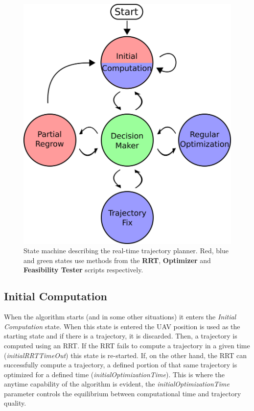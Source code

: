 \begin{figure}[H]
    \centering
    \includegraphics[width=0.6\linewidth]{Figures/06_software/stateColored.png}
    \caption{State machine describing the real-time trajectory planner. Red, blue and green states use methods from the \textbf{RRT}, \textbf{Optimizer} and \textbf{Feasibility Tester} scripts respectively.}
    \label{fig:stateMachine}
\end{figure}

\subsection{Initial Computation}

When the algorithm starts (and in some other situations) it enters the \textit{Initial Computation} state. When this state is entered the UAV position is used as the starting state and if there is a trajectory, it is discarded. Then, a trajectory is computed using an RRT. If the RRT fails to compute a trajectory in a given time (\textit{initialRRTTimeOut}) this state is re-started. If, on the other hand, the RRT can successfully compute a trajectory, a defined portion of that same trajectory is optimized for a defined time (\textit{initialOptimizationTime}). This is where the anytime capability of the algorithm is evident, the  \textit{initialOptimizationTime} parameter controls the equilibrium between computational time and trajectory quality.


